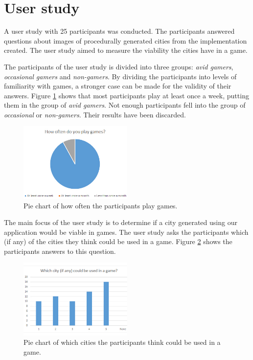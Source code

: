 \section{User study}
	A user study with 25 participants was conducted. The participants answered questions about images of procedurally generated cities from the implementation created. The user study aimed to measure the viability the cities have in a game.
	
	\par
	The participants of the user study is divided into three groups: \textit{avid gamers}, \textit{occasional gamers} and \textit{non-gamers}. By dividing the participants into levels of familiarity with games, a stronger case can be made for the validity of their answers. Figure \ref{fig:pie-chart-often-play} shows that most participants play at least once a week, putting them in the group of \textit{avid gamers}. Not enough participants fell into the group of \textit{occasional} or \textit{non-gamers}. Their results have been discarded.
	
	\begin{figure}[h]
		\centering
		\includegraphics[width=0.5\textwidth]{"Images/OftenPlay"}
		\caption{Pie chart of how often the participants play games.}
		\label{fig:pie-chart-often-play}
	\end{figure}
	
	The main focus of the user study is to determine if a city generated using our application would be viable in games. The user study asks the participants which (if any) of the cities they think could be used in a game. Figure \ref{fig:pie-chart-use-in-game} shows the participants answers to this question.
	
	\begin{figure}[h]
		\centering
		\includegraphics[width=0.5\textwidth]{"Images/UseInGame"}
		\caption{Pie chart of which cities the participants think could be used in a game.}
		\label{fig:pie-chart-use-in-game}
	\end{figure}
	
